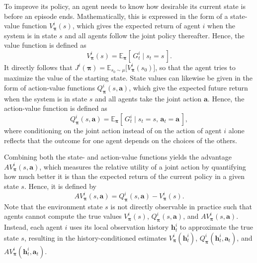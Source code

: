To improve its policy, an agent needs to know how desirable its current state is before an episode ends. Mathematically, this is expressed in the form of a
state-value function $V^i_{\boldsymbol{\pi}}(s)$, which gives the expected return of agent $i$ when the system is in state $s$ and all agents follow the joint policy thereafter. Hence, the value function is defined as 
\begin{equation}
    V^i_{\boldsymbol{\pi}}(s) = \mathbb{E}_{\boldsymbol{\pi}}\!\left[\, G^i_t \mid s_t = s \,\right].
\end{equation}
It directly follows that $J^i(\boldsymbol{\pi})=\mathbb{E}_{s_0\sim\mu}\big[V^i_{\boldsymbol{\pi}}(s_0)\big]$, so that the agent tries to maximize the value of the starting state. State values can likewise be given in the form of action-value functions $Q^i_{\boldsymbol{\pi}}(s, \mathbf{a})$, which give the expected future return when the system is in state $s$ and all agents take the joint action $\mathbf{a}$. Hence, the action-value function is defined as
\begin{equation}
    Q^i_{\boldsymbol{\pi}}(s, \mathbf{a}) = \mathbb{E}_{\boldsymbol{\pi}}\!\left[\, G^i_t \mid s_t = s,\, \mathbf{a}_t = \mathbf{a} \,\right],
\end{equation}
where conditioning on the joint action instead of on the action of agent $i$ alone reflects that the outcome for one agent depends on the choices of the others. 

Combining both the state- and action-value functions yields the advantage $AV^i_{\boldsymbol{\pi}}(s, \mathbf{a})$, which measures the relative utility of a joint action by quantifying how much better it is than the expected return of the current policy in a given state $s$. Hence, it is defined by
\begin{equation}
    AV^i_{\boldsymbol{\pi}}(s, \mathbf{a}) = Q^i_{\boldsymbol{\pi}}(s, \mathbf{a}) - V^i_{\boldsymbol{\pi}}(s).
\end{equation}
Note that the environment state $s$ is not directly observable in practice such that agents cannot compute the true values $V^i_{\boldsymbol{\pi}}(s)$, $Q^i_{\boldsymbol{\pi}}(s, \mathbf{a})$, and $AV^i_{\boldsymbol{\pi}}(s, \mathbf{a})$. Instead, each agent $i$ uses its local observation history $\mathbf{h}_t^i$ to approximate the true state $s$, resulting in the history-conditioned estimates $V^i_{\boldsymbol{\pi}}(\mathbf{h}_t^i)$, $Q^i_{\boldsymbol{\pi}}(\mathbf{h}_t^i, \mathbf{a}_t)$, and $AV^i_{\boldsymbol{\pi}}(\mathbf{h}_t^i, \mathbf{a}_t)$.\\

